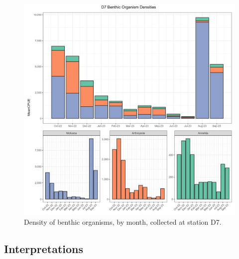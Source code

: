 \documentclass[
]{article}
\begin{document}
\begin{figure}

{\centering \includegraphics[width=9.84in,height=\textheight]{../figures/benthic_bar_d7.jpg}

}

\caption{\label{fig-benthic_d7}Density of benthic organisms, by month,
collected at station D7.}

\end{figure}

\hypertarget{interpretations}{%
\subsection{Interpretations}\label{interpretations}}
\end{document}
